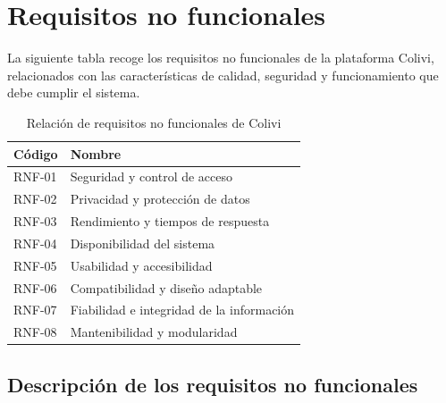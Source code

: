 \section{Requisitos no funcionales}

La siguiente tabla recoge los requisitos no funcionales de la plataforma Colivi, relacionados con las características de calidad, seguridad y funcionamiento que debe cumplir el sistema.

\begin{table}[H]
    \centering
    \begin{tabular}{|p{2cm}|p{12cm}|}
        \hline
        \textbf{Código} & \textbf{Nombre} \\ \hline
        RNF-01 & Seguridad y control de acceso \\ \hline
        RNF-02 & Privacidad y protección de datos \\ \hline
        RNF-03 & Rendimiento y tiempos de respuesta \\ \hline
        RNF-04 & Disponibilidad del sistema \\ \hline
        RNF-05 & Usabilidad y accesibilidad \\ \hline
        RNF-06 & Compatibilidad y diseño adaptable \\ \hline
        RNF-07 & Fiabilidad e integridad de la información \\ \hline
        RNF-08 & Mantenibilidad y modularidad \\ \hline
    \end{tabular}
    \caption{Relación de requisitos no funcionales de Colivi}
    \label{tab:requisitos-no-funcionales}
\end{table}

\subsection{Descripción de los requisitos no funcionales}

